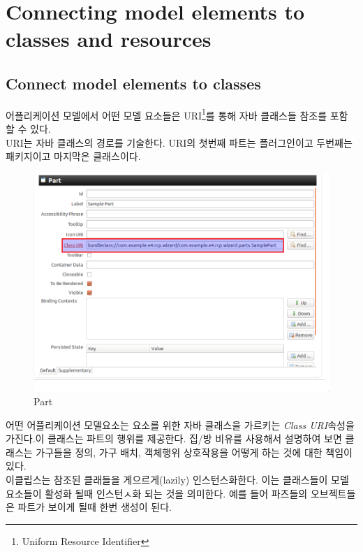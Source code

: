 \section{Connecting model elements to classes and resources}

\subsection{Connect model elements to classes}
어플리케이션 모델에서 어떤 모델 요소들은 URI\footnote{Uniform Resource Identifier}를 통해 자바 클래스들 참조를 포함 할 수 있다. \\

URI는 자바 클래스의 경로를 기술한다. URI의 첫번째 파트는 플러그인이고 두번째는 패키지이고 마지막은 클래스이다. \\

\begin{figure}[h]
\centering
\includegraphics[scale=.35]{./image/e4_009}
\captionsetup{justification=centering}
\caption{Part}
\label{fig:9}       %
\end{figure}

어떤 어플리케이션 모델요소는 요소를 위한 자바 클래스을 가르키는 \textit{Class URI}속성을 가진다.이 클래스는 파트의 행위를 제공한다. 집/방 비유를 사용해서 설명하여 보면 클래스는 가구들을 정의, 가구 배치, 객체행위 상호작용을 어떻게 하는 것에 대한 책임이 있다. \\

이클립스는 참조된 클래들을 게으르게(lazily) 인스턴스화한다. 이는 클래스들이 모델요소들이 활성화 될때 인스턴ㅅ화 되는 것을 의미한다. 예를 들어 파츠들의 오브젝트들은 파트가 보이게 될때 한번 생성이 된다. \\

